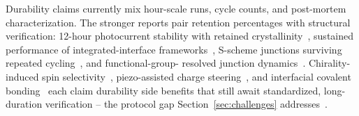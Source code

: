 Durability claims currently mix hour-scale runs, cycle counts, and
post-mortem characterization. The stronger reports pair retention
percentages with structural verification: 12-hour photocurrent stability
with retained crystallinity~\cite{lu2024copper}, sustained performance of
integrated-interface frameworks~\cite{he2023integrated}, S-scheme junctions
surviving repeated cycling~\cite{dong20222d,zhang2022s,shang20212d,
dong2023fabrication,zhou2025functional,liu2025in}, and functional-group-
resolved junction dynamics~\cite{guo2025engineering,xu2025localized}.
Chirality-induced spin selectivity~\cite{wu2026chiral}, piezo-assisted
charge steering~\cite{gao2025piezoceramics}, and interfacial covalent
bonding~\cite{yi2024constructing,li2025modifying,qi2026construction}
each claim durability side benefits that still await standardized,
long-duration verification -- the protocol gap Section~\ref{sec:challenges}
addresses~\cite{sun2025design,hao2025covalent,doremus2024photocatalytic}.
